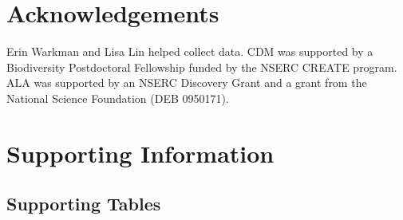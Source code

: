\documentclass[11pt, oneside]{article}
\begin{document}

\section*{Acknowledgements}
Erin Warkman and Lisa Lin helped collect data. CDM was supported by a Biodiversity Postdoctoral Fellowship funded by the NSERC CREATE program. ALA was supported by an NSERC Discovery Grant and a grant from the National Science Foundation (DEB 0950171).


\setlength{\bibsep}{6pt}
\bigskip




\clearpage


\section*{Supporting Information}

\renewcommand\thefigure{S\arabic{figure}}    
\renewcommand\thetable{S\arabic{table}}    
\renewcommand\theequation{S\arabic{equation}}    
\setcounter{table}{0}    
\setcounter{equation}{0}
\setcounter{figure}{0}


\subsection*{Supporting Tables}
\end{document}
